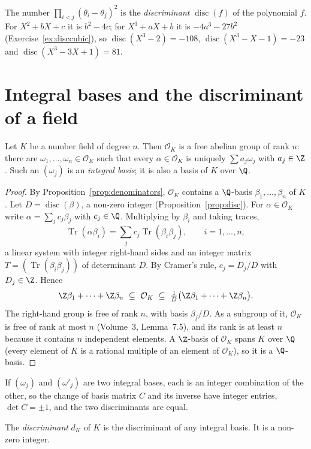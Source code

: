 The number $\prod_{i<j}(\theta_i-\theta_j)^2$ is the \emph{discriminant} $\operatorname{disc}(f)$ of the polynomial
$f$. For $X^2+bX+c$ it is $b^2-4c$; for $X^3+aX+b$ it is $-4a^3-27b^2$ (Exercise~\ref{ex:disccubic}), so
$\operatorname{disc}(X^3-2)=-108$, $\operatorname{disc}(X^3-X-1)=-23$ and $\operatorname{disc}(X^3-3X+1)=81$.

\section{Integral bases and the discriminant of a field}

\begin{theorem}\label{thm:intbasis}
Let $K$ be a number field of degree $n$. Then $\mathcal O_K$ is a free abelian group of rank $n$: there are
$\omega_1,\dots,\omega_n\in\mathcal O_K$ such that every $\alpha\in\mathcal O_K$ is uniquely $\sum a_j\omega_j$ with
$a_j\in\Z$. Such an $(\omega_j)$ is an \emph{integral basis}; it is also a basis of $K$ over $\Q$.
\end{theorem}
\begin{proof}
By Proposition~\ref{prop:denominators}, $\mathcal O_K$ contains a $\Q$-basis $\beta_1,\dots,\beta_n$ of $K$. Let
$D=\operatorname{disc}(\beta)$, a non-zero integer (Proposition~\ref{prop:disc}). For $\alpha\in\mathcal O_K$ write
$\alpha=\sum_jc_j\beta_j$ with $c_j\in\Q$. Multiplying by $\beta_i$ and taking traces,
\[
\operatorname{Tr}(\alpha\beta_i)=\sum_jc_j\operatorname{Tr}(\beta_i\beta_j),\qquad i=1,\dots,n,
\]
a linear system with integer right-hand sides and an integer matrix $T=(\operatorname{Tr}(\beta_i\beta_j))$ of
determinant $D$. By Cramer's rule, $c_j=D_j/D$ with $D_j\in\Z$. Hence
\[
\Z\beta_1+\dots+\Z\beta_n\ \subseteq\ \mathcal O_K\ \subseteq\ \tfrac1D\bigl(\Z\beta_1+\dots+\Z\beta_n\bigr).
\]
The right-hand group is free of rank $n$, with basis $\beta_j/D$. As a subgroup of it, $\mathcal O_K$ is free of rank
at most $n$ (Volume~3, Lemma~7.5), and its rank is at least $n$ because it contains $n$ independent elements. A $\Z$-basis
of $\mathcal O_K$ spans $K$ over $\Q$ (every element of $K$ is a rational multiple of an element of $\mathcal O_K$), so
it is a $\Q$-basis.
\end{proof}

If $(\omega_j)$ and $(\omega'_j)$ are two integral bases, each is an integer combination of the other, so the change of
basis matrix $C$ and its inverse have integer entries, $\det C=\pm1$, and the two discriminants are equal.

\begin{definition}
The \emph{discriminant} $d_K$ of $K$ is the discriminant of any integral basis. It is a non-zero integer.
\end{definition}


